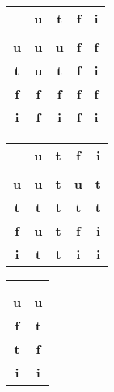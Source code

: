 \documentclass{tlp}
\begin{document}
\begin{center}
\begin{minipage}{0.38\textwidth}
\begin{tabular}{|c||c|c|c|c|}
\cline{1-5}
 & \textbf{u} & \textbf{t} & \textbf{f} & \textbf{i}\\
\cline{1-5}
\vspace{-3.9mm} & & & & \\
\cline{1-5}
\textbf{u}          & \textbf{u} & \textbf{u} & \textbf{f} & \textbf{f}\\
\cline{1-5}
\textbf{t}          & \textbf{u} & \textbf{t} & \textbf{f} & \textbf{i}\\
\cline{1-5}
\textbf{f}          & \textbf{f} & \textbf{f} & \textbf{f} & \textbf{f}\\
\cline{1-5}
\textbf{i}          & \textbf{f} & \textbf{i} & \textbf{f} & \textbf{i}\\
\cline{1-5}
\end{tabular}
\end{minipage}
\begin{minipage}{0.38\textwidth}
\begin{tabular}{|c||c|c|c|c|}
\cline{1-5}
 & \textbf{u} & \textbf{t} & \textbf{f} & \textbf{i}\\
\cline{1-5}
\vspace{-3.9mm} & & & & \\
\cline{1-5}
\textbf{u}        & \textbf{u} & \textbf{t} & \textbf{u} & \textbf{t}\\
\cline{1-5}
\textbf{t}        & \textbf{t} & \textbf{t} & \textbf{t} & \textbf{t}\\
\cline{1-5}
\textbf{f}        & \textbf{u} & \textbf{t} & \textbf{f} & \textbf{i}\\
\cline{1-5}
\textbf{i}        & \textbf{t} & \textbf{t} & \textbf{i} & \textbf{i}\\
\cline{1-5}
\end{tabular}
\end{minipage}
\begin{minipage}{0.19\textwidth}
\begin{tabular}{|c||c|}
\cline{1-2}
    &
\\ \cline{1-2}
\vspace{-3.9mm} &
\\ \cline{1-2}
   \textbf{u} & \textbf{u}
\\ \cline{1-2}
   \textbf{f} & \textbf{t}
\\ \cline{1-2}
   \textbf{t} & \textbf{f}
\\ \cline{1-2}
   \textbf{i} & \textbf{i}
\\ \cline{1-2}
\end{tabular}
\end{minipage}
\medskip
\end{center}
\end{document}
